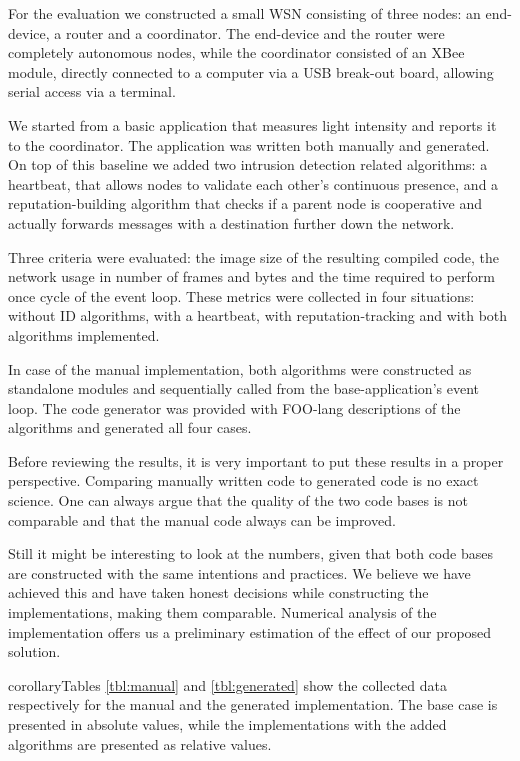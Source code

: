 \documentclass[conference]{IEEEtran}
\begin{document}
For the evaluation we constructed a small WSN consisting of three nodes: an
end-device, a router and a coordinator. The end-device and the router were
completely autonomous nodes, while the coordinator consisted of an XBee module,
directly connected to a computer via a USB break-out board, allowing serial
access via a terminal.

We started from a basic application that measures light intensity and reports
it to the coordinator. The application was written both manually and generated.
On top of this baseline we added two intrusion detection related algorithms: a
heartbeat, that allows nodes to validate each other's continuous presence, and
a reputation-building algorithm that checks if a parent node is cooperative and
actually forwards messages with a destination further down the
network\cite{ganeriwal2008reputation}.

Three criteria were evaluated: the image size of the resulting compiled code,
the network usage in number of frames and bytes and the time required to
perform once cycle of the event loop. These metrics were collected in four
situations: without ID algorithms, with a heartbeat, with reputation-tracking
and with both algorithms implemented.

In case of the manual implementation, both algorithms were constructed as
standalone modules and sequentially called from the base-application's
event loop. The code generator was provided with FOO-lang descriptions of the
algorithms and generated all four cases.

Before reviewing the results, it is very important to put these results in a
proper perspective. Comparing manually written code to generated code is no
exact science. One can always argue that the quality of the two code bases is
not comparable and that the manual code always can be improved.

Still it might be interesting to look at the numbers, given that both code
bases are constructed with the same intentions and practices. We believe we
have achieved this and have taken honest decisions while constructing the
implementations, making them comparable. Numerical analysis of the
implementation offers us a preliminary estimation of the effect of our proposed
solution.

corollaryTables \ref{tbl:manual} and \ref{tbl:generated} show the collected data
respectively for the manual and the generated implementation. The base case is
presented in absolute values, while the implementations with the added
algorithms are presented as relative values.
\end{document}
